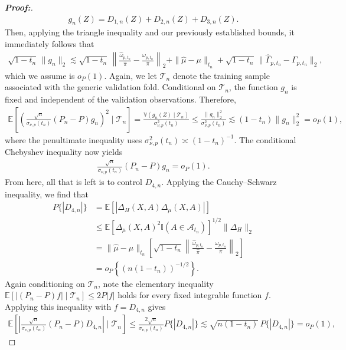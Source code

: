 \documentclass[11pt,twoside]{article}
\theoremstyle{definition}
\theoremstyle{remark}
\begin{document}
\begin{proof}[\textbf{Proof:}]
\begin{align*}
     g_n(Z) = D_{1,n}(Z) + D_{2,n}(Z) + D_{3,n}(Z).
\end{align*}
Then, applying the triangle inequality and our previously established bounds, it immediately follows that
\begin{align*}
    \sqrt{1-t_n}\,\|g_n\|_2 \lesssim \sqrt{1-t_n}\, \left\| \frac{\widehat\omega_{p,t_n}}{\widehat\pi} - \frac{\omega_{p,t_n}}{\pi} \right\|_2 + \|\widehat\mu-\mu\|_{t_n} + \sqrt{1-t_n}\, \|\widehat\Gamma_{p,t_n}-\Gamma_{p,t_n}\|_2,
\end{align*}
which we assume is $o_P(1)$. Again, we let $\mathcal{T}_n$ denote the training sample associated with the generic validation fold. Conditional on $\mathcal T_n$, the function $g_n$ is fixed and independent of the validation observations. Therefore,
\begin{align*}
    \mathbb{E}\!\left[\left(\frac{\sqrt{n}}{\sigma_{\nu,p}(t_n)} (P_n-P)g_n \right)^2 \mid \mathcal{T}_n \right] =  \frac{\mathbb{V}(g_n(Z)\mid\mathcal{T}_n)}{\sigma_{\nu,p}^2(t_n)} \leq \frac{\|g_n\|_2^2}{\sigma_{\nu,p}^2(t_n)} \lesssim (1-t_n)\|g_n\|_2^2 = o_P(1),
\end{align*}
where the penultimate inequality uses $\sigma_{\nu,p}^2(t_n)\asymp(1-t_n)^{-1}$. The conditional Chebyshev inequality now yields
\begin{align*}
    \frac{\sqrt{n}}{\sigma_{\nu,p}(t_n)} (P_n-P)g_n = o_P(1).
\end{align*}
From here, all that is left is to control $D_{4,n}$. Applying the Cauchy--Schwarz inequality, we find that
\begin{align*}
    P\{|D_{4,n}|\} &= \mathbb{E}\!\left[ |\Delta_H(X,A)\Delta_\mu(X,A)| \right] \\
    &\leq \mathbb{E}\!\left[ \Delta_\mu(X,A)^2 \mathbb{I}(A\in\mathcal A_{t_n})\right]^{1/2} \|\Delta_H\|_2 \\
    &= \|\widehat\mu-\mu\|_{t_n} \left[ \sqrt{1-t_n} \left\| \frac{\widehat\omega_{p,t_n}}{\widehat\pi} - \frac{\omega_{p,t_n}}{\pi} \right\|_2 \right] \\
    &= o_P\!\left\{ (n(1-t_n))^{-1/2} \right\}.
\end{align*}
Again conditioning on $\mathcal T_n$, note the elementary inequality $\mathbb{E}\!\left[ |(P_n-P)f| \mid  \mathcal{T}_n \right] \leq 2P|f|$ holds for every fixed integrable function $f$. Applying this inequality with $f=D_{4,n}$ gives
\begin{align*}
    \mathbb{E}\!\left[ \left| \frac{\sqrt{n}}{\sigma_{\nu,p}(t_n)} (P_n-P)D_{4,n} \right| \mid \mathcal{T}_n \right] \leq \frac{2\sqrt n}{\sigma_{\nu,p}(t_n)} P\{|D_{4,n}| \} \lesssim \sqrt{n(1-t_n)}\,P\{|D_{4,n}|\} = o_P(1),

\end{align*}
\end{proof}
\end{document}
